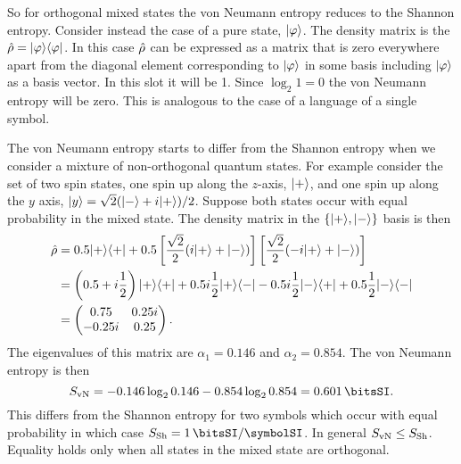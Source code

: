     So for orthogonal mixed states the von Neumann entropy reduces to the Shannon entropy.
    Consider instead the case of a pure state, \(\vert {\varphi} \rangle\).
    The density matrix is the \(\hat{\rho} = \vert {\varphi}\rangle\langle {\varphi} \vert\).
    In this case \(\hat{\rho}\) can be expressed as a matrix that is zero everywhere apart from the diagonal element corresponding to \(\vert {\varphi} \rangle\) in some basis including \(\vert {\varphi} \rangle\) as a basis vector.
    In this slot it will be 1.
    Since \(\log_2 1 = 0\) the von Neumann entropy will be zero.
    This is analogous to the case of a language of a single symbol.
    
    The von Neumann entropy starts to differ from the Shannon entropy when we consider a mixture of non-orthogonal quantum states.
    For example consider the set of two spin states, one spin up along the \(z\)-axis, \(\vert {+} \rangle\), and one spin up along the \(y\) axis, \(\vert {y} \rangle = \sqrt{2}(\vert {-} \rangle + i\vert {+} \rangle)/2\).
    Suppose both states occur with equal probability in the mixed state.
    The density matrix in the \(\{\vert {+} \rangle, \vert {-} \rangle\}\) basis is then
    \begin{align*}
        \hat{\rho} &= 0.5\vert {+}\rangle\langle {+} \vert + 0.5\left[\frac{\sqrt{2}}{2}(i\vert {+} \rangle + \vert {-} \rangle)\right] \left[\frac{\sqrt{2}}{2}(-i\vert {+} \rangle + \vert {-} \rangle)\right]\\
        &= \left( 0.5 + i\frac{1}{2} \right)\vert {+}\rangle\langle {+} \vert + 0.5i\frac{1}{2}\vert {+}\rangle\langle {-} \vert - 0.5i\frac{1}{2}\vert {-}\rangle\langle {+} \vert + 0.5\frac{1}{2}\vert {-}\rangle\langle {-} \vert\\
        &= 
        \begin{pmatrix}
            0.75   & 0.25i\\
            -0.25i & 0.25
        \end{pmatrix}
        .
    \end{align*}
    The eigenvalues of this matrix are \(\alpha_1 = 0.146\) and \(\alpha_2 = 0.854\).
    The von Neumann entropy is then
    \[\vonNeumannEntropy = -0.146\log_20.146 - 0.854\log_20.854 = \SI{0.601}{\bitsSI}.\]
    This differs from the Shannon entropy for two symbols which occur with equal probability in which case \(\shannonEntropy = \SI{1}{\bitsSI/\symbolSI}\).
    In general \(S_{\mathrm{vN}} \le S_{\mathrm{Sh}}\).
    Equality holds only when all states in the mixed state are orthogonal.
    

